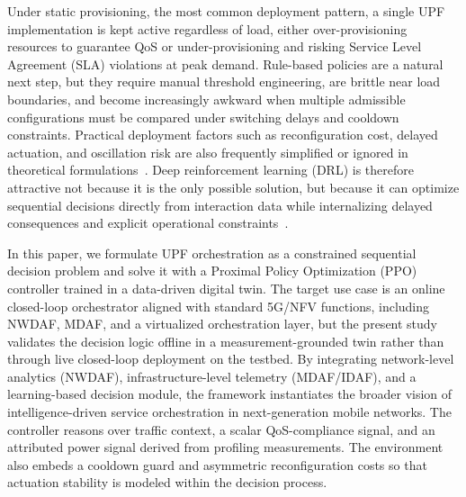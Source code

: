 \documentclass[a4paper,fleqn]{cas-sc}
\begin{document}
Under static provisioning, the most common deployment pattern, a single UPF implementation is kept active regardless of load, either over-provisioning resources to guarantee QoS or under-provisioning and risking Service Level Agreement (SLA) violations at peak demand. Rule-based  policies are a natural next step, but they require manual threshold engineering, are brittle near load boundaries, and become increasingly awkward when multiple admissible configurations must be compared under switching delays and cooldown constraints. Practical deployment factors such as reconfiguration cost, delayed actuation, and oscillation risk are also frequently simplified or ignored in theoretical formulations~\cite{soto2021sds,tournaire2019mascots}. Deep reinforcement learning (DRL) is therefore attractive not because it is the only possible solution, but because it can optimize sequential decisions directly from interaction data while internalizing delayed consequences and explicit operational constraints~\cite{pei2020jsac,luong2019comst}.

In this paper, we formulate UPF orchestration as a constrained sequential decision problem and solve it with a Proximal Policy Optimization (PPO) controller trained in a data-driven digital twin. The target use case is an online closed-loop orchestrator aligned with standard 5G/NFV functions, including NWDAF, MDAF, and a virtualized orchestration layer, but the present study validates the decision logic offline in a measurement-grounded twin rather than through live closed-loop deployment on the testbed. By integrating network-level analytics (NWDAF), infrastructure-level telemetry (MDAF/IDAF), and a learning-based decision module, the framework instantiates the broader vision of intelligence-driven service orchestration in next-generation mobile networks. The controller reasons over traffic context, a scalar QoS-compliance signal, and an attributed power signal derived from profiling measurements. The environment also embeds a cooldown guard and asymmetric reconfiguration costs so that actuation stability is modeled within the decision process.
\end{document}
